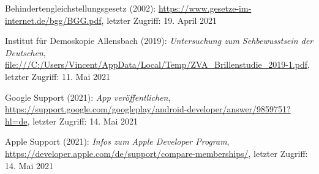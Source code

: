 \documentclass[11pt,a4paper]{article}
\begin{document}
\begin{itemize}
     Behindertengleichstellungsgesetz (2002): \url{https://www.gesetze-im-internet.de/bgg/BGG.pdf}, letzter Zugriff: 19. April 2021

     Institut für Demoskopie Allensbach (2019): \textit{Untersuchung zum Sehbewusstsein der Deutschen},  \url{file:///C:/Users/Vincent/AppData/Local/Temp/ZVA_Brillenstudie_2019-1.pdf}, letzter Zugriff: 11. Mai 2021

     Google Support (2021): \textit{App veröffentlichen}, \url{https://support.google.com/googleplay/android-developer/answer/9859751?hl=de}, letzter Zugriff: 14. Mai 2021

     Apple Support (2021): \textit{Infos zum Apple Developer Program}, \url{https://developer.apple.com/de/support/compare-memberships/}, letzter Zugriff: 14. Mai 2021
\end{itemize}
\end{document}
